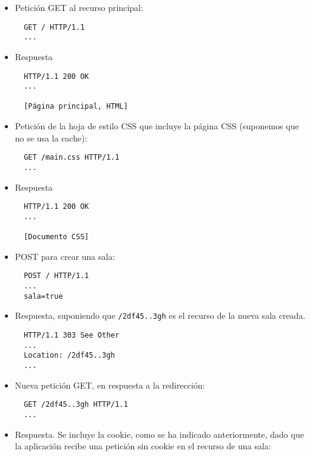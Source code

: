 \begin{itemize}

\item Petición GET al recurso principal: 

\begin{verbatim}
  GET / HTTP/1.1
  ...
\end{verbatim}

\item Respuesta

\begin{verbatim}
  HTTP/1.1 200 OK
  ...

  [Página principal, HTML]
\end{verbatim}

\item Petición de la hoja de estilo CSS que incluye la página CSS (suponemos que no se usa la cache):

  \begin{verbatim}
  GET /main.css HTTP/1.1
  ...
\end{verbatim}

\item Respuesta

\begin{verbatim}
  HTTP/1.1 200 OK
  ...

  [Documento CSS]
\end{verbatim}

\item POST para crear una sala:

\begin{verbatim}
  POST / HTTP/1.1
  ...
  sala=true
\end{verbatim}

\item Respuesta, suponiendo que \texttt{/2df45..3gh} es el recurso de la nueva sala creada.

\begin{verbatim}
  HTTP/1.1 303 See Other
  ...
  Location: /2df45..3gh
  ...
\end{verbatim}
  
\item Nueva petición GET, en respuesta a la redirección:

\begin{verbatim}
  GET /2df45..3gh HTTP/1.1
  ...
\end{verbatim}

\item Respuesta. Se incluye la cookie, como se ha indicado anteriormente, dado que la aplicación recibe una petición sin cookie en el recurso de una sala:


\end{itemize}
